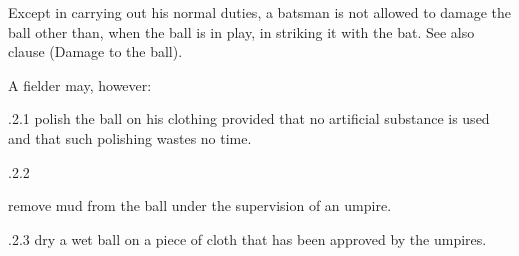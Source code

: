\documentclass[12pt]{article}
\begin{document}
\vspace{\baselineskip}
\begin{adjustwidth}{0.5in}{0.14in}
{\fontsize{9pt}{10.8pt}\selectfont Except in carrying out his normal duties, a batsman is not allowed to damage the ball other than, when the ball is in play, in striking it with the bat. See also clause (Damage to the ball).\par}\par

\end{adjustwidth}


\vspace{\baselineskip}
\begin{adjustwidth}{0.5in}{0.0in}
{\fontsize{9pt}{10.8pt}\selectfont A fielder may, however:\par}\par

\end{adjustwidth}


\vspace{\baselineskip}
\begin{adjustwidth}{1.18in}{0.5in}
{\fontsize{9pt}{10.8pt}.2.1 \tabto{1.17in} polish the ball on his clothing provided that no artificial substance is used and that such polishing wastes no time.\par}\par

\end{adjustwidth}


\vspace{\baselineskip}
\begin{adjustwidth}{0.49in}{0.0in}
{\fontsize{9pt}{10.8pt}.2.2 \tabto{1.17in} {\fontsize{8pt}{9.6pt}\selectfont remove mud from the ball under the supervision of an umpire.\par}\par}\par

\end{adjustwidth}


\vspace{\baselineskip}
\begin{adjustwidth}{0.49in}{0.0in}
{\fontsize{9pt}{10.8pt}.2.3 \tabto{1.17in} dry a wet ball on a piece of cloth that has been approved by the umpires.\par}\par

\end{adjustwidth}
\end{document}
